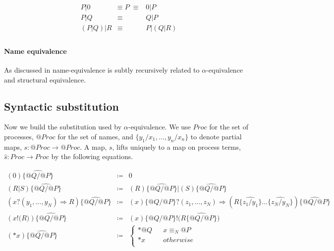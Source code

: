 \documentclass[]{amsart}
\makeatletter
\newcommand{\id}[1]{\texttt{#1}}
\newcommand{\pzero}{\mathbin{0}}
\newcommand{\juxtap}{\mathbin{\id{|}}}
\newcommand{\scong}{\mathbin{\equiv}}
\newcommand{\nameeq}{\mathbin{\equiv_N}}
\newcommand{\quotep}[1]{@#1}
\newcommand{\dropn}[1]{*#1}
\newcommand{\substp}[2]{\id{\{} \quotep{#1} / \quotep{#2} \id{\}}}
\newcommand{\substn}[2]{\id{\{} #1 / #2 \id{\}}}
\newcommand{\psubstp}[2]{\widehat{\substp{#1}{#2}}}
\newcommand{\psubstn}[2]{\widehat{\substn{#1}{#2}}}
\newcommand{\Proc}{\mathbin{Proc}}
\newcommand{\QProc}{\quotep{\mathbin{Proc}}}
\newcommand{\defneqls}{\coloneqq}
\theoremstyle{definition}
\theoremstyle{remark}
\numberwithin{equation}{subsection}
\makeatother
\begin{document}
\begin{eqnarray*}
	{P} \juxtap \pzero	
		&  \scong \; {P} \; \scong & 
			\pzero \juxtap {P} \\
	{P} \juxtap {Q}	
		& \scong & 
			{Q} \juxtap {P} \\
	({P} \juxtap {Q}) \juxtap {R}
		& \scong & 
			{P} \juxtap ({Q} \juxtap {R}) \\
\end{eqnarray*}

\paragraph{Name equivalence} As discussed in
\cite{DBLP:conf/tgc/MeredithR05} name-equivalence is subtly
recursively related to $\alpha$-equivalence and structural equivalence.

\subsection{Syntactic substitution}

Now we build the substitution used by $\alpha$-equivalence. We use
$\Proc$ for the set of processes, $\QProc$ for the set of names, and
${\{}{y_1} / {x_1}, \ldots, {y_n} / {x_n}{\}}$ to denote partial maps, $s : \QProc
\rightarrow \QProc$. A map, $s$, lifts uniquely to a map on process terms, $\widehat{s} :
\Proc \rightarrow \Proc$ by the following equations.

\begin{eqnarray*}
(0) \psubstp{Q}{P}         & \defneqls &    0 \\
(R \juxtap S) \psubstp{Q}{P}
		& \defneqls &    
		(R)\psubstp{Q}{P} \juxtap (S) \psubstp{Q}{P} \\
({x}{?}{( y_1, \ldots, y_N )} \Rightarrow R) \psubstp{Q}{P}    
		& \defneqls &    
		{(x)}\substp{Q}{P}{?}{( z_1, \ldots, z_N )}\Rightarrow (R \psubstn{z_1}{y_1}\ldots\psubstn{z_N}{y_N}) \psubstp{Q}{P} \\
({x}{!}{(}{R}{)}) \psubstp{Q}{P}  
 		& \defneqls &
 		{(x)\substp{Q}{P}}{!}{(}{ R \psubstp{Q}{P} }{)} \\
({*}{x})  \psubstp{Q}{P}       
		& \defneqls & 
		\left\{ 
			\begin{array}{ccc} 
				\dropn{\quotep{Q}} & & x \nameeq \quotep{P} \\
                              	\dropn{x} & & otherwise \\
			\end{array}
		\right.
\end{eqnarray*}
 
\end{document}
